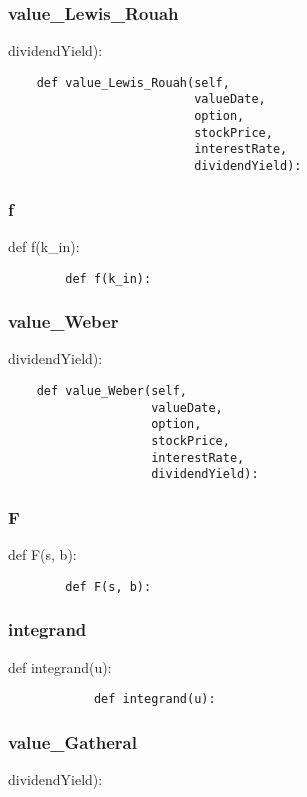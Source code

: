 \documentclass[twoside,11pt]{book}
\begin{document}
\subsubsection*{{\bf value\_Lewis\_Rouah}}
dividendYield): 

\begin{lstlisting}
    def value_Lewis_Rouah(self,
                          valueDate,
                          option,
                          stockPrice,
                          interestRate,
                          dividendYield):
\end{lstlisting}

\subsubsection*{{\bf f}}
def f(k\_in): 

\begin{lstlisting}
        def f(k_in):
\end{lstlisting}

\subsubsection*{{\bf value\_Weber}}
dividendYield): 

\begin{lstlisting}
    def value_Weber(self,
                    valueDate,
                    option,
                    stockPrice,
                    interestRate,
                    dividendYield):
\end{lstlisting}

\subsubsection*{{\bf F}}
def F(s, b): 

\begin{lstlisting}
        def F(s, b):
\end{lstlisting}

\subsubsection*{{\bf integrand}}
def integrand(u): 

\begin{lstlisting}
            def integrand(u):
\end{lstlisting}

\subsubsection*{{\bf value\_Gatheral}}
dividendYield): 
\end{document}
